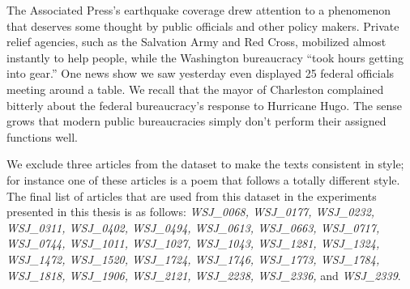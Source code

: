 \begin{examples}
	\label{ex:wsj-1818}
	The Associated Press's earthquake coverage drew attention to a phenomenon that deserves some thought by public officials and other policy makers. 
	Private relief agencies, such as the Salvation Army and Red Cross, mobilized almost instantly to help people, while the Washington bureaucracy ``took hours getting into gear.'' 
	One news show we saw yesterday even displayed 25 federal officials meeting around a table. 
	We recall that the mayor of Charleston complained bitterly about the federal bureaucracy's response to Hurricane Hugo. 
	The sense grows that modern public bureaucracies simply don't perform their assigned functions well. 
\end{examples}


We exclude three articles from the dataset to make the texts consistent in style; for instance one of these articles is a poem that follows a totally different style. 
The final list of articles that are used from this dataset in the experiments presented in this thesis is as follows:
\emph{
WSJ\_0068,
WSJ\_0177,
WSJ\_0232,
WSJ\_0311,
WSJ\_0402,
WSJ\_0494,
WSJ\_0613,
WSJ\_0663,
WSJ\_0717,
WSJ\_0744,
WSJ\_1011,
WSJ\_1027,
WSJ\_1043,
WSJ\_1281,
WSJ\_1324,
WSJ\_1472,
WSJ\_1520,
WSJ\_1724,
WSJ\_1746,
WSJ\_1773,
WSJ\_1784,
WSJ\_1818,
WSJ\_1906,
WSJ\_2121,
WSJ\_2238,
WSJ\_2336, } and \emph{WSJ\_2339}.


